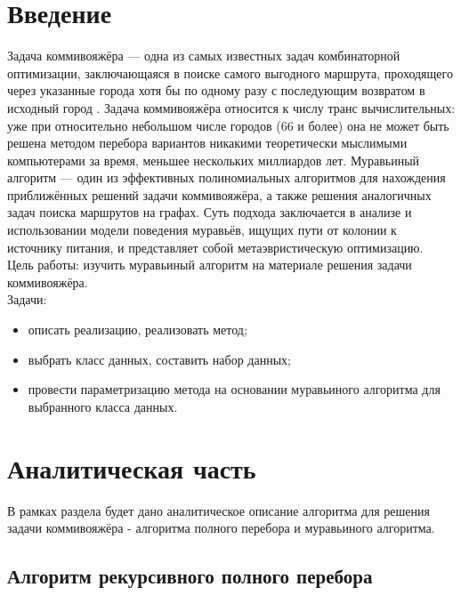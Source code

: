 \documentclass[a4paper,12pt]{report}
\begin{document}
	\setcounter{page}{2}
	\tableofcontents
    \chapter*{Введение}

    	Задача коммивояжёра — одна из самых известных задач комбинаторной оптимизации, заключающаяся в поиске самого выгодного маршрута, проходящего через указанные города хотя бы по одному разу с последующим возвратом в исходный город \cite{commi2}.
    	Задача коммивояжёра относится к числу транс вычислительных: уже при относительно небольшом числе городов (66 и более) она не может быть решена методом перебора вариантов никакими теоретически мыслимыми компьютерами за время, меньшее нескольких миллиардов лет.
    	Муравьиный алгоритм — один из эффективных полиномиальных алгоритмов для нахождения приближённых решений задачи коммивояжёра, а также решения аналогичных задач поиска маршрутов на графах. 
    	Суть подхода заключается в анализе и использовании модели поведения муравьёв, ищущих пути от колонии к источнику питания, и представляет собой метаэвристическую оптимизацию.\\

		Цель работы: изучить муравьиный алгоритм на материале решения задачи коммивояжёра.\\
		
		Задачи:
		\begin{itemize}
			\item описать реализацию, реализовать метод;
			\item выбрать класс данных, составить набор данных;
			\item провести параметризацию метода на основании муравьиного алгоритма   для выбранного класса данных.
		\end{itemize}

    \label{sec:intro}

    \newpage

    \chapter{Аналитическая часть}
        \label{sec:analitic_part}

        	В рамках раздела будет дано аналитическое описание алгоритма для решения задачи коммивояжёра - алгоритма полного перебора и муравьиного алгоритма.
        	
	\section{Алгоритм рекурсивного полного перебора}
\end{document}
